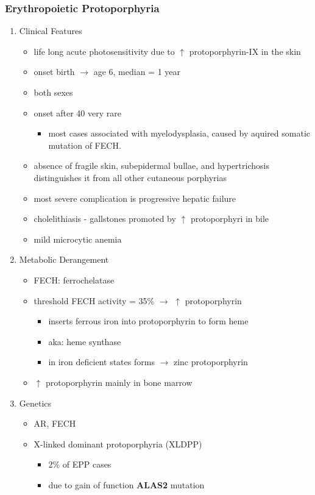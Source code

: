 \documentclass{scrartcl}
\begin{document}
\subsubsection{Erythropoietic Protoporphyria}
\label{sec:orge2d5997}
\begin{enumerate}
\item Clinical Features
\label{sec:orge57eaea}
\begin{itemize}
\item life long acute photosensitivity due to \(\uparrow\) protoporphyrin-IX
in the skin
\item onset birth \(\to\) age 6, median = 1 year
\item both sexes
\item onset after 40 very rare
\begin{itemize}
\item most cases associated with myelodysplasia, caused by aquired
somatic mutation of FECH.
\end{itemize}
\item absence of fragile skin, subepidermal bullae, and hypertrichosis
distinguishes it from all other cutaneous porphyrias
\item most severe complication is progressive hepatic failure
\item cholelithiasis - gallstones promoted by \(\uparrow\) protoporphyri in bile
\item mild microcytic anemia
\end{itemize}

\item Metabolic Derangement
\label{sec:orgc579399}
\begin{itemize}
\item FECH: ferrochelatase
\item threshold FECH activity = 35\% \(\to\) \(\uparrow\) protoporphyrin
\begin{itemize}
\item inserts ferrous iron into protoporphyrin to form heme
\item aka: heme synthase
\item in iron deficient states forms \(\to\) zinc protoporphyrin
\end{itemize}
\item \(\uparrow\) protoporphyrin mainly in bone marrow
\end{itemize}

\item Genetics
\label{sec:orgb25d85a}
\begin{itemize}
\item AR, FECH
\item X-linked dominant protoporphyria (XLDPP)
\begin{itemize}
\item 2\% of EPP cases
\item due to gain of function \textbf{ALAS2} mutation
\end{itemize}
\end{itemize}


\end{enumerate}
\end{document}

